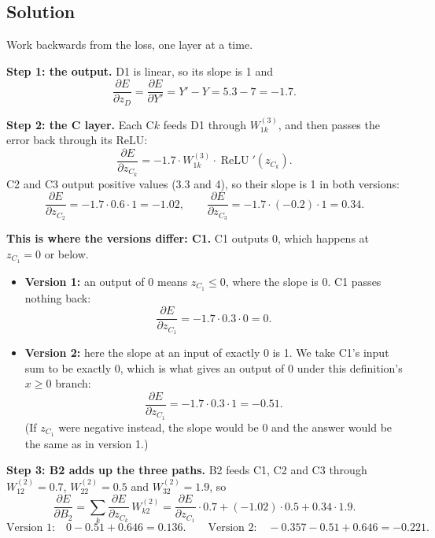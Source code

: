 \documentclass[11pt]{article}
\begin{document}
\newpage
\setlength{\abovedisplayskip}{5pt}\setlength{\belowdisplayskip}{5pt}
\setlength{\abovedisplayshortskip}{3pt}\setlength{\belowdisplayshortskip}{3pt}
\subsection*{Solution}

Work backwards from the loss, one layer at a time.

\textbf{Step 1: the output.} D1 is linear, so its slope is 1 and
\[
\frac{\partial E}{\partial z_{D}} = \frac{\partial E}{\partial Y'} = Y' - Y = 5.3 - 7 = -1.7 .
\]

\textbf{Step 2: the C layer.} Each C$k$ feeds D1 through $W^{(3)}_{1k}$, and then passes the error back
through its ReLU:
\[
\frac{\partial E}{\partial z_{C_k}} = -1.7 \cdot W^{(3)}_{1k} \cdot \operatorname{ReLU}'(z_{C_k}) .
\]
C2 and C3 output positive values (3.3 and 4), so their slope is 1 in both versions:
\[
\frac{\partial E}{\partial z_{C_2}} = -1.7 \cdot 0.6 \cdot 1 = -1.02, \qquad
\frac{\partial E}{\partial z_{C_3}} = -1.7 \cdot (-0.2) \cdot 1 = 0.34 .
\]

\begin{versionbox}
\textbf{This is where the versions differ: C1.} C1 outputs 0, which happens at $z_{C_1} = 0$ or below.
\begin{itemize}\setlength{\itemsep}{0pt}\setlength{\topsep}{2pt}
\item \textbf{Version 1:} an output of 0 means $z_{C_1} \le 0$, where the slope is 0. C1 passes
nothing back:
\[ \frac{\partial E}{\partial z_{C_1}} = -1.7 \cdot 0.3 \cdot 0 = 0 . \]
\item \textbf{Version 2:} here the slope at an input of exactly 0 is 1. We take C1's input sum to
be exactly 0, which is what gives an output of 0 under this definition's $x \ge 0$ branch:
\[ \frac{\partial E}{\partial z_{C_1}} = -1.7 \cdot 0.3 \cdot 1 = -0.51 . \]
(If $z_{C_1}$ were negative instead, the slope would be 0 and the answer would be the same as in
version 1.)
\end{itemize}
\end{versionbox}

\textbf{Step 3: B2 adds up the three paths.} B2 feeds C1, C2 and C3 through $W^{(2)}_{12} = 0.7$,
$W^{(2)}_{22} = 0.5$ and $W^{(2)}_{32} = 1.9$, so
\[
\frac{\partial E}{\partial B_2} = \sum_k \frac{\partial E}{\partial z_{C_k}}\, W^{(2)}_{k2}
= \frac{\partial E}{\partial z_{C_1}} \cdot 0.7 + (-1.02) \cdot 0.5 + 0.34 \cdot 1.9 .
\]
\[
\text{Version 1:} \quad 0 - 0.51 + 0.646 = 0.136 . \qquad
\text{Version 2:} \quad -0.357 - 0.51 + 0.646 = -0.221 .
\]
\end{document}
